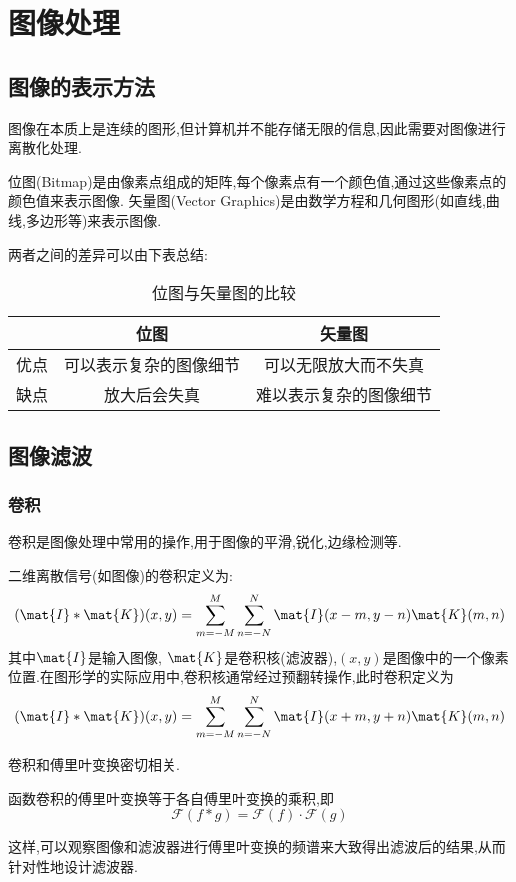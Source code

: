 \documentclass{ctexart}
\begin{document}
\section{图像处理}
\subsection{图像的表示方法}
图像在本质上是连续的图形,但计算机并不能存储无限的信息,因此需要对图像进行离散化处理.
\begin{definition}[位图与矢量图]
    位图(Bitmap)是由像素点组成的矩阵,每个像素点有一个颜色值,通过这些像素点的颜色值来表示图像.
    矢量图(Vector Graphics)是由数学方程和几何图形(如直线,曲线,多边形等)来表示图像.
\end{definition}
两者之间的差异可以由下表总结:
\begin{table}[h]
    \centering
    \begin{tabular}{ccc}
        \hline
        & 位图 & 矢量图 \\
        \hline
        优点 & 可以表示复杂的图像细节 & 可以无限放大而不失真 \\
        \hline
        缺点 & 放大后会失真 & 难以表示复杂的图像细节 \\
        \hline
    \end{tabular}
    \caption{位图与矢量图的比较}
\end{table}
\subsection{图像滤波}
\subsubsection{卷积}
卷积是图像处理中常用的操作,用于图像的平滑,锐化,边缘检测等.
\begin{definition}[卷积]
    二维离散信号(如图像)的卷积定义为:
    \[
        (\mat{I} * \mat{K})(x,y) = \sum_{m=-M}^{M} \sum_{n=-N}^{N} \mat{I}(x-m,y-n)\mat{K}(m,n)
    \]
    其中$\mat{I}$是输入图像, $\mat{K}$是卷积核(滤波器),$(x,y)$是图像中的一个像素位置.在图形学的实际应用中,卷积核通常经过预翻转操作,此时卷积定义为
    \[(\mat{I} * \mat{K})(x,y) = \sum_{m=-M}^{M} \sum_{n=-N}^{N} \mat{I}(x+m,y+n)\mat{K}(m,n)\]
\end{definition}
卷积和傅里叶变换密切相关.
\begin{theorem}[卷积定理]
    函数卷积的傅里叶变换等于各自傅里叶变换的乘积,即
    \[\mathcal{F}(f * g) = \mathcal{F}(f) \cdot \mathcal{F}(g)\]
\end{theorem}
这样,可以观察图像和滤波器进行傅里叶变换的频谱来大致得出滤波后的结果,从而针对性地设计滤波器.
\end{document}
